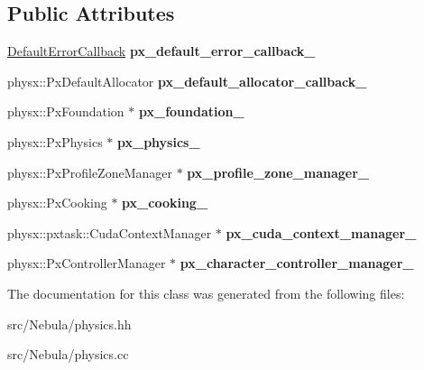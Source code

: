 \subsection*{Public Attributes}
\begin{DoxyCompactItemize}
\item 
\hypertarget{classNeb_1_1physics_a94f4acbaaa5742c633007fd6b3819c5b}{\hyperlink{classDefaultErrorCallback}{Default\-Error\-Callback} {\bfseries px\-\_\-default\-\_\-error\-\_\-callback\-\_\-}}\label{classNeb_1_1physics_a94f4acbaaa5742c633007fd6b3819c5b}

\item 
\hypertarget{classNeb_1_1physics_a0415a6eb0242881540994bd7a667e32c}{physx\-::\-Px\-Default\-Allocator {\bfseries px\-\_\-default\-\_\-allocator\-\_\-callback\-\_\-}}\label{classNeb_1_1physics_a0415a6eb0242881540994bd7a667e32c}

\item 
\hypertarget{classNeb_1_1physics_ad10a620fe6052b1db0fad0ed97d52ebb}{physx\-::\-Px\-Foundation $\ast$ {\bfseries px\-\_\-foundation\-\_\-}}\label{classNeb_1_1physics_ad10a620fe6052b1db0fad0ed97d52ebb}

\item 
\hypertarget{classNeb_1_1physics_ab98dfdf9b8671f794f6f5811e4f1319a}{physx\-::\-Px\-Physics $\ast$ {\bfseries px\-\_\-physics\-\_\-}}\label{classNeb_1_1physics_ab98dfdf9b8671f794f6f5811e4f1319a}

\item 
\hypertarget{classNeb_1_1physics_a0fad63bf6306306fb22d3f58560d1c11}{physx\-::\-Px\-Profile\-Zone\-Manager $\ast$ {\bfseries px\-\_\-profile\-\_\-zone\-\_\-manager\-\_\-}}\label{classNeb_1_1physics_a0fad63bf6306306fb22d3f58560d1c11}

\item 
\hypertarget{classNeb_1_1physics_a041b8e5a85614606bc821d4a8d5d88d2}{physx\-::\-Px\-Cooking $\ast$ {\bfseries px\-\_\-cooking\-\_\-}}\label{classNeb_1_1physics_a041b8e5a85614606bc821d4a8d5d88d2}

\item 
\hypertarget{classNeb_1_1physics_a1292b571e26510adef2bd316797071c0}{physx\-::pxtask\-::\-Cuda\-Context\-Manager $\ast$ {\bfseries px\-\_\-cuda\-\_\-context\-\_\-manager\-\_\-}}\label{classNeb_1_1physics_a1292b571e26510adef2bd316797071c0}

\item 
\hypertarget{classNeb_1_1physics_aa3c2db56b039c1380242e968de69250f}{physx\-::\-Px\-Controller\-Manager $\ast$ {\bfseries px\-\_\-character\-\_\-controller\-\_\-manager\-\_\-}}\label{classNeb_1_1physics_aa3c2db56b039c1380242e968de69250f}

\end{DoxyCompactItemize}


The documentation for this class was generated from the following files\-:\begin{DoxyCompactItemize}
\item 
src/\-Nebula/physics.\-hh\item 
src/\-Nebula/physics.\-cc\end{DoxyCompactItemize}

